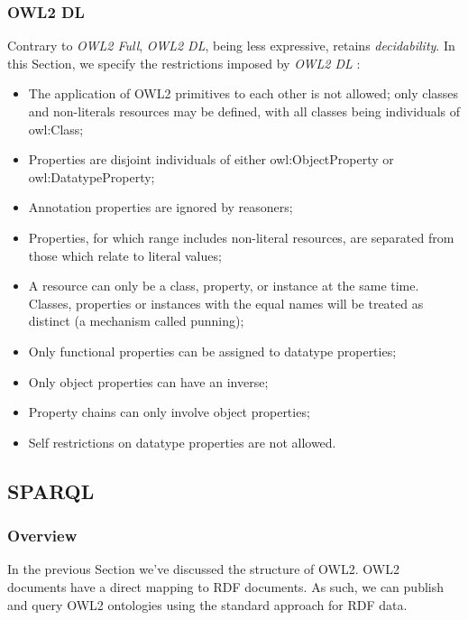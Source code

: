 \subsubsection{OWL2 DL}

Contrary to \emph{OWL2 Full}, \emph{OWL2 DL}, being less expressive, retains \emph{decidability}. In this Section, we specify the restrictions imposed by \emph{OWL2 DL} \autocite{Antoniou2012-nj}: 

\begin{itemize}
    \item The application of \gls{OWL2} primitives to each other is not allowed; only classes and non-literals resources may be defined, with all classes being individuals of owl:Class;
    \item Properties are disjoint individuals of either owl:ObjectProperty or owl:DatatypeProperty;
    \item Annotation properties are ignored by reasoners;
    \item Properties, for which range includes non-literal resources, are separated from those which relate to literal values; 
    \item A resource can only be a class, property, or instance at the same time. Classes, properties or instances with the equal names will be treated as distinct (a mechanism called punning);
    \item Only functional properties can be assigned to datatype properties;
    \item Only object properties can have an inverse;
    \item Property chains can only involve object properties;
    \item Self restrictions on datatype properties are not allowed.
\end{itemize}

\subsection{SPARQL}
\label{ch2:sec:semantic-web:sparql}

\subsubsection{Overview}

In the previous Section we've discussed the structure of \gls{OWL2}. \gls{OWL2} documents have a direct mapping to \gls{RDF} documents. As such, we can publish and query \gls{OWL2} ontologies using the standard approach for \gls{RDF} data. 

